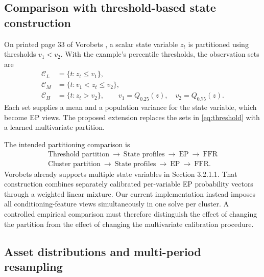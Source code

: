 \documentclass[11pt,a4paper]{article}
\begin{document}
\subsection{Comparison with threshold-based state construction}

On printed page 33 of Vorobets \cite{vorobets2025}, a scalar state variable \(z_t\) is partitioned using thresholds \(v_1<v_2\). With the example's percentile thresholds, the observation sets are
\begin{equation}
\begin{aligned}
\mathcal C_L&=\{t:z_t\leq v_1\},\\
\mathcal C_M&=\{t:v_1<z_t\leq v_2\},\\
\mathcal C_H&=\{t:z_t>v_2\},
\qquad v_1=Q_{0.25}(z),\quad v_2=Q_{0.75}(z).
\end{aligned}
\label{eq:threshold}
\end{equation}
Each set supplies a mean and a population variance for the state variable, which become EP views. The proposed extension replaces the sets in \eqref{eq:threshold} with a learned multivariate partition.

The intended partitioning comparison is
\[
\begin{array}{c}
\text{Threshold partition}\ \longrightarrow\ \text{State profiles}\
\longrightarrow\ \text{EP}\ \longrightarrow\ \text{FFR}\\[4pt]
\text{Cluster partition}\ \longrightarrow\ \text{State profiles}\
\longrightarrow\ \text{EP}\ \longrightarrow\ \text{FFR}.
\end{array}
\]
Vorobets already supports multiple state variables in Section 3.2.1.1. That construction combines separately calibrated per-variable EP probability vectors through a weighted linear mixture. Our current implementation instead imposes all conditioning-feature views simultaneously in one solve per cluster. A controlled empirical comparison must therefore distinguish the effect of changing the partition from the effect of changing the multivariate calibration procedure.

\subsection{Asset distributions and multi-period resampling}
\end{document}
